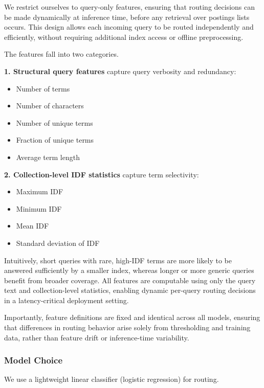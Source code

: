 \documentclass[11pt]{article}
\begin{document}
We restrict ourselves to query-only features, ensuring that routing decisions can be made dynamically at inference time, before any retrieval over postings lists occurs. This design allows each incoming query to be routed independently and efficiently, without requiring additional index access or offline preprocessing.

\vspace{\topsep}
\noindent The features fall into two categories.

\vspace{\topsep}
\noindent \textbf{1. Structural query features} capture query verbosity and redundancy:
\begin{itemize}
    \item Number of terms
    \item Number of characters
    \item Number of unique terms
    \item Fraction of unique terms
    \item Average term length
\end{itemize}
\textbf{2. Collection-level IDF statistics} capture term selectivity:
\begin{itemize}
    \item Maximum IDF
    \item Minimum IDF
    \item Mean IDF
    \item Standard deviation of IDF
\end{itemize}

\noindent Intuitively, short queries with rare, high-IDF terms are more likely to be answered sufficiently by a smaller index, whereas longer or more generic queries benefit from broader coverage. All features are computable using only the query text and collection-level statistics, enabling dynamic per-query routing decisions in a latency-critical deployment setting.

Importantly, feature definitions are fixed and identical across all models, ensuring that differences in routing behavior arise solely from thresholding and training data, rather than feature drift or inference-time variability.

\subsubsection{Model Choice}

We use a lightweight linear classifier (logistic regression) for routing.
\end{document}
